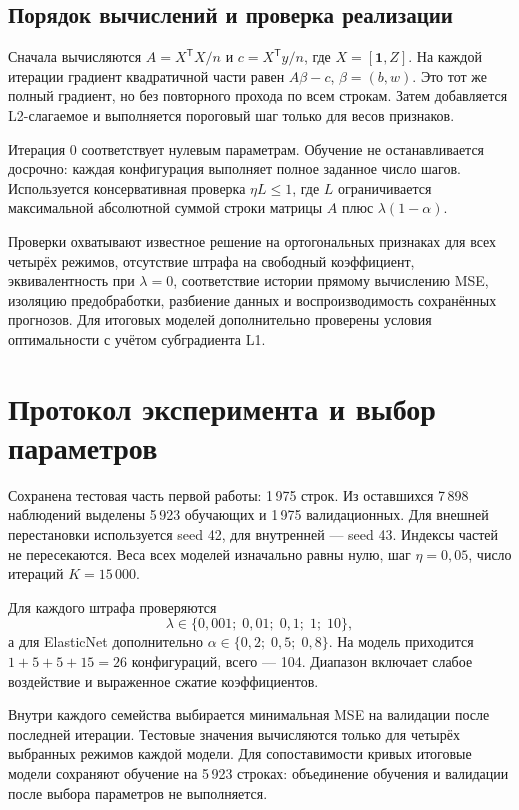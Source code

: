 \subsection{Порядок вычислений и проверка реализации}
Сначала вычисляются $A=X^{\mathsf T}X/n$ и $c=X^{\mathsf T}y/n$, где $X=[\mathbf{1},Z]$. На каждой итерации градиент квадратичной части равен $A\beta-c$, $\beta=(b,w)$. Это тот же полный градиент, но без повторного прохода по всем строкам. Затем добавляется L2-слагаемое и выполняется пороговый шаг только для весов признаков.

Итерация 0 соответствует нулевым параметрам. Обучение не останавливается досрочно: каждая конфигурация выполняет полное заданное число шагов. Используется консервативная проверка $\eta L\leq1$, где $L$ ограничивается максимальной абсолютной суммой строки матрицы $A$ плюс $\lambda(1-\alpha)$.

Проверки охватывают известное решение на ортогональных признаках для всех четырёх режимов, отсутствие штрафа на свободный коэффициент, эквивалентность при $\lambda=0$, соответствие истории прямому вычислению MSE, изоляцию предобработки, разбиение данных и воспроизводимость сохранённых прогнозов. Для итоговых моделей дополнительно проверены условия оптимальности с учётом субградиента L1.

\clearpage
\section{Протокол эксперимента и выбор параметров}
Сохранена тестовая часть первой работы: 1\,975 строк. Из оставшихся 7\,898 наблюдений выделены 5\,923 обучающих и 1\,975 валидационных. Для внешней перестановки используется seed 42, для внутренней --- seed 43. Индексы частей не пересекаются. Веса всех моделей изначально равны нулю, шаг $\eta=0{,}05$, число итераций $K=15\,000$.

Для каждого штрафа проверяются
\[
\lambda\in\{0{,}001;\;0{,}01;\;0{,}1;\;1;\;10\},
\]
а для ElasticNet дополнительно $\alpha\in\{0{,}2;\;0{,}5;\;0{,}8\}$. На модель приходится $1+5+5+15=26$ конфигураций, всего --- 104. Диапазон включает слабое воздействие и выраженное сжатие коэффициентов.

Внутри каждого семейства выбирается минимальная MSE на валидации после последней итерации. Тестовые значения вычисляются только для четырёх выбранных режимов каждой модели. Для сопоставимости кривых итоговые модели сохраняют обучение на 5\,923 строках: объединение обучения и валидации после выбора параметров не выполняется.

